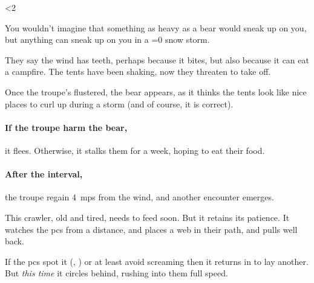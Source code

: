 \ifnum\value{temperature}<2

\bear

You wouldn't imagine that something as heavy as a bear would sneak up on you, but anything can sneak up on you in a
\ifnum\value{temperature}=0
  \gls{snow}
\fi
storm.

\begin{boxtext}
  They say the wind has teeth, perhaps because it bites, but also because it can eat a campfire.
  The tents have been shaking, now they threaten to take off.
\end{boxtext}

Once the troupe's flustered, the bear appears, as it thinks the tents look like nice places to curl up during a storm (and of course, it is correct).

\paragraph{If the troupe harm the bear,}
it flees.
Otherwise, it stalks them for a week, hoping to eat their food.

\paragraph{After the \gls{interval},}
the troupe regain 4~\glspl{mp} from the wind, and another encounter emerges.

\else

This \gls{crawler}, old and tired, needs to feed soon.
But it retains its patience.
It watches the \glspl{pc} from a distance, and places a web in their path, and pulls well back.

\chitincrawler
\label{crawlerStatblock}

If the \glspl{pc} spot it (, \tn[10]) or at least avoid screaming then it returns in  to lay another.
But \emph{this time} it circles behind, rushing into them full speed.


\fi
